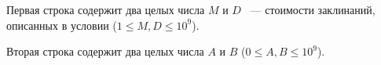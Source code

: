 Первая строка содержит два целых числа $M$ и $D$ ~--- стоимости заклинаний, описанных в условии ($1 \leq M, D \leq 10^9$).

Вторая строка содержит два целых числа $A$ и $B$ ($0 \leq A, B \leq 10^9$).